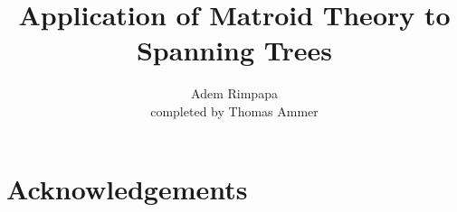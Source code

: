 \documentclass[11pt,a4paper]{article}
\begin{document}
\title{Application of Matroid Theory to Spanning Trees}
\author{Adem Rimpapa\\ completed by Thomas Ammer}
\maketitle

\begin{abstract}
\end{abstract}


\section{Acknowledgements}





\end{document}
